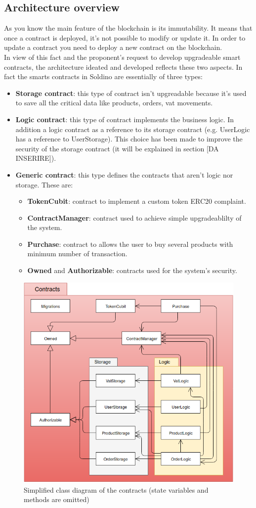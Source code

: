 \subsection{Architecture overview}
As you know the main feature of the blockchain is its immutability. It means that once a contract is 
deployed, it's not possible to modify or update it. In order to update a contract you need to deploy 
a new contract on the blockchain.\\
In view of this fact and the proponent's request to develop upgradeable smart contracts, the architecture ideated and developed reflects these two aspects. In fact the smarts contracts in Soldino
are essentially of three types:
\begin{itemize}
	\item\textbf{Storage contract}: this type of contract isn't upgreadable because it's used
		to save all the critical data like products, orders, vat movements. 
	\item\textbf{Logic contract}: this type of contract implements the business logic. In addition
	a logic contract as a reference to its storage contract (e.g. UserLogic has a reference to UserStorage). This choice has been made to improve the security of the storage contract (it will be explained in section [DA INSERIRE]).
	\item\textbf{Generic contract}: this type defines the contracts that aren't logic nor storage.
	These are:
	\begin{itemize}
		\item\textbf{TokenCubit}: contract to implement a custom token ERC20 complaint.
		\item\textbf{ContractManager}: contract used to achieve simple upgradeablilty of the system.
		\item\textbf{Purchase}: contract to allows the user to buy several products with minimum number of transaction.
		\item\textbf{Owned} and \textbf{Authorizable}: contracts used for the system's security.
	\end{itemize}
\end{itemize}

\begin{figure}[h]
	\centering
	\includegraphics[scale=0.369]{res/images/architecture.png}
	\caption{Simplified class diagram of the contracts (state variables and methods are omitted)}
\end{figure}